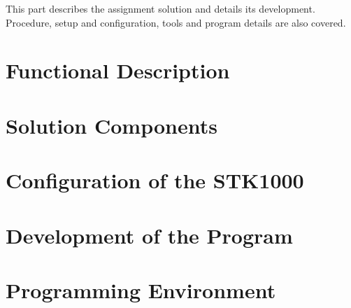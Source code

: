 This part describes the assignment solution and details its development. Procedure, setup and configuration, tools and program details are also covered.
\section{Functional Description}
	

\section{Solution Components}
	

\section{Configuration of the STK1000}
	

\section{Development of the Program}
	

\section{Programming Environment}
	
